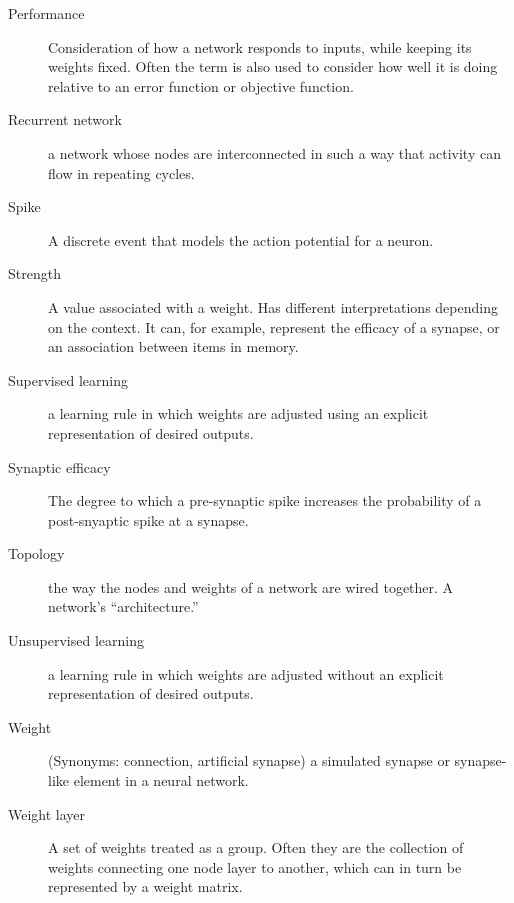 \begin{description}
\item[Performance] Consideration of how a network responds to inputs, while keeping its weights fixed.  Often the term is also used to consider how well it is doing relative to an error function or objective function.
\item[Recurrent network] a network whose nodes are interconnected in such a way that activity can flow in repeating cycles.
\item[Spike] A discrete event that models the action potential for a neuron.
\item[Strength] A value associated with a weight. Has different interpretations depending on the context. It can, for example, represent the efficacy of a synapse, or an association between items in memory.
\item[Supervised learning] a learning rule in which weights are adjusted using an explicit representation of desired outputs.
\item[Synaptic efficacy] The degree to which a pre-synaptic spike increases the probability of a post-snyaptic spike at a synapse.
\item[Topology] the way the nodes and weights of a network are wired together. A network's ``architecture.''
\item[Unsupervised learning] a learning rule in which weights are adjusted without an explicit representation of desired outputs.
\item[Weight] (Synonyms: connection, artificial synapse) a simulated synapse or synapse-like element in a neural network. 
\item[Weight layer] A set of weights treated as a group. Often they are the collection of weights connecting one node layer to another, which can in turn be represented by a weight matrix.
\end{description}